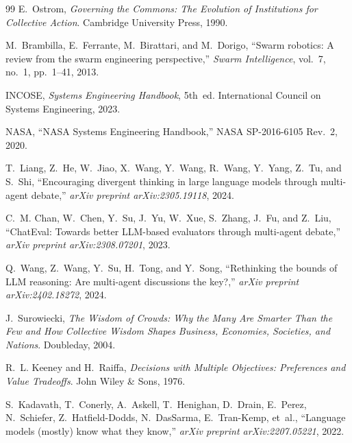 \documentclass[11pt,a4paper]{article}
\begin{document}
\begin{thebibliography}{99}
E.~Ostrom, \emph{Governing the Commons: The Evolution of Institutions for Collective Action}. Cambridge University Press, 1990.

M.~Brambilla, E.~Ferrante, M.~Birattari, and M.~Dorigo, ``Swarm robotics: A review from the swarm engineering perspective,'' \emph{Swarm Intelligence}, vol.~7, no.~1, pp.~1--41, 2013.

INCOSE, \emph{Systems Engineering Handbook}, 5th~ed. International Council on Systems Engineering, 2023.

NASA, ``NASA Systems Engineering Handbook,'' NASA SP-2016-6105 Rev.~2, 2020.

T.~Liang, Z.~He, W.~Jiao, X.~Wang, Y.~Wang, R.~Wang, Y.~Yang, Z.~Tu, and S.~Shi, ``Encouraging divergent thinking in large language models through multi-agent debate,'' \emph{arXiv preprint arXiv:2305.19118}, 2024.

C.~M. Chan, W.~Chen, Y.~Su, J.~Yu, W.~Xue, S.~Zhang, J.~Fu, and Z.~Liu, ``ChatEval: Towards better LLM-based evaluators through multi-agent debate,'' \emph{arXiv preprint arXiv:2308.07201}, 2023.

Q.~Wang, Z.~Wang, Y.~Su, H.~Tong, and Y.~Song, ``Rethinking the bounds of LLM reasoning: Are multi-agent discussions the key?,'' \emph{arXiv preprint arXiv:2402.18272}, 2024.

J.~Surowiecki, \emph{The Wisdom of Crowds: Why the Many Are Smarter Than the Few and How Collective Wisdom Shapes Business, Economies, Societies, and Nations}. Doubleday, 2004.

R.~L. Keeney and H.~Raiffa, \emph{Decisions with Multiple Objectives: Preferences and Value Tradeoffs}. John Wiley \& Sons, 1976.

S.~Kadavath, T.~Conerly, A.~Askell, T.~Henighan, D.~Drain, E.~Perez, N.~Schiefer, Z.~Hatfield-Dodds, N.~DasSarma, E.~Tran-Kemp, et~al., ``Language models (mostly) know what they know,'' \emph{arXiv preprint arXiv:2207.05221}, 2022.

\end{thebibliography}
\end{document}
